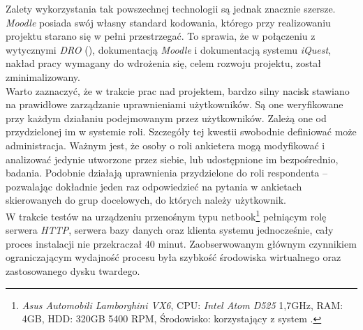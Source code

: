 Zalety wykorzystania tak powszechnej technologii są jednak znacznie szersze. \textit{Moodle} posiada swój własny standard kodowania, którego przy realizowaniu projektu starano się w pełni przestrzegać. To sprawia, że w połączeniu z wytycznymi \textit{DRO} (), dokumentacją \textit{Moodle} i dokumentacją systemu \textit{iQuest}, nakład pracy wymagany do wdrożenia się, celem rozwoju projektu, został zminimalizowany. \\

Warto zaznaczyć, że w trakcie prac nad projektem, bardzo silny nacisk stawiano na prawidłowe zarządzanie uprawnieniami użytkowników. Są one weryfikowane przy każdym działaniu podejmowanym przez użytkowników. Zależą one od przydzielonej im w systemie roli. Szczegóły tej kwestii swobodnie definiować może administracja. Ważnym jest, że osoby o roli ankietera mogą modyfikować i analizować jedynie utworzone przez siebie, lub udostępnione im bezpośrednio, badania. Podobnie działają uprawnienia przydzielone do roli respondenta -- pozwalając dokładnie jeden raz odpowiedzieć na pytania w ankietach skierowanych do grup docelowych, do których należy użytkownik. \\

W trakcie testów na urządzeniu przenośnym typu netbook\footnote{\textit{Asus Automobili Lamborghini VX6}, CPU: \textit{Intel Atom D525} 1,7GHz, RAM: 4GB, HDD: 320GB 5400 RPM, Środowisko: korzystający z  system .} pełniącym rolę serwera \textit{HTTP}, serwera bazy danych oraz klienta systemu jednocześnie, cały proces instalacji nie przekraczał 40 minut. Zaobserwowanym głównym czynnikiem ograniczającym wydajność procesu była szybkość środowiska wirtualnego oraz zastosowanego dysku twardego.

